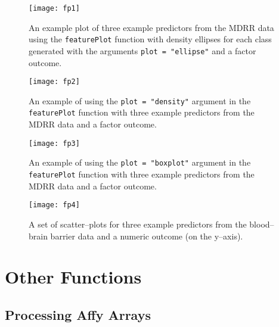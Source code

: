 \documentclass[12pt]{article}
\begin{document}
\begin{figure}[hb]
   \begin{center}	
      \vspace*{1 in}   	
      \texttt{[image: fp1]}
      \caption{An example plot of three example predictors from the MDRR data using the \texttt{featurePlot} function with density ellipses for each class generated with the arguments
      {\tt plot = "ellipse"} and a factor outcome.}
      \label{f:classEllipse}         
   \end{center}
\end{figure}  

\begin{figure}[p]
   \begin{center}		
      \texttt{[image: fp2]}
      \caption{An example of using the {\tt plot = "density"} argument in the \texttt{featurePlot} function with three example predictors from the MDRR data and a factor outcome.}
      \label{f:densityPlot}
      \vspace*{.25 in}             
      \texttt{[image: fp3]}
      \caption{An example of using the {\tt plot = "boxplot"} argument in the \texttt{featurePlot} function with three example predictors from the MDRR data and a factor outcome.}
      \label{f:boxPlot}      
      \vspace*{.25 in}                   
      \texttt{[image: fp4]}
      \caption{A set of scatter--plots for three example predictors from the blood--brain barrier data and a numeric outcome (on the y--axis).}            
      \label{f:scatPlot}         
   \end{center}
\end{figure}  

\clearpage 

\section{Other Functions}

\subsection{Processing Affy Arrays}
\end{document}
